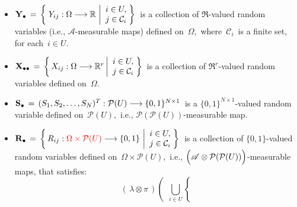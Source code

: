 \begin{itemize}
\item
    $
    \mathbf{Y}_{\bullet}
    \, = \,
        \left\{\;
            Y_{ij} : \Omega \longrightarrow \mathbb{R}
            \,\left\vert
            \begin{array}{c} i \in U, \\ j \in \mathcal{C}_{i} \end{array}
            \right.
            \!\!\right\}
    $\,
    is a collection of $\Re$-valued random variables
    (i.e., $\mathscr{A}$-measurable maps)
    defined on \,$\Omega$,\,
    where \,$\mathcal{C}_{i}$\, is a finite set, for each \,$i \in U$.
\item
    $
    \mathbf{X}_{\bullet\bullet}
    \, = \,
        \left\{\,
            X_{ij} : \Omega \longrightarrow \mathbb{R}^{r}
            \left\vert
            \begin{array}{c} i \in U, \\ j \in \mathcal{C}_{i} \end{array}
            \right.
            \!\!\right\}
    $\,
    is a collection of $\Re^{r}$-valued random variables defined on \,$\Omega$.\,
\item
    $\mathbf{S}_{\bullet} \,=\, (S_{1},S_{2},\ldots,S_{N})^{T} : \mathcal{P}(U) \longrightarrow \{0,1\}^{N \times 1}$\,
    is a $\{0,1\}^{N \times 1}$-valued random variable defined on \,$\mathcal{P}(U)$,\,
    i.e., $\mathcal{P}(\mathcal{P}(U))$-measurable map.
\item
    $
    \mathbf{R}_{\bullet}
    \, = \,
        \left\{\,
            R_{ij} : {\color{red}\Omega \times \mathcal{P}(U)} \longrightarrow \{0,1\}
            \,\left\vert
            \begin{array}{c} i \in U, \\ j \in \mathcal{C}_{i} \end{array}
            \right.
            \!\!\right\}
    $\,
    is a collection of $\{0,1\}$-valued random variables
    defined on \,$\Omega \times \mathcal{P}(U)$,\,
    i.e.,
    $\left(\mathscr{A} \overset{{\color{white}.}}{\otimes} \mathcal{P}(\mathcal{P}(U))\right)$-measurable maps, that satisfies:
    \begin{equation*}
    (\,\lambda\otimes\pi\,)\!\left(\;\,
        \underset{i \in U}{\bigcup}\left\{\;

\end{equation*}
\end{itemize}
